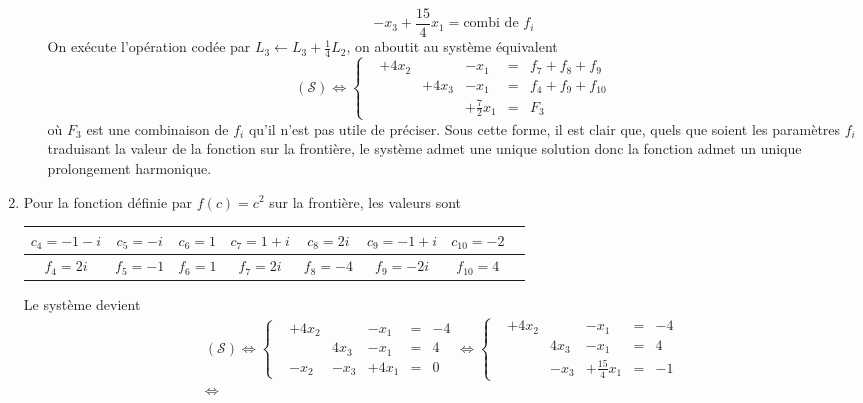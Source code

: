 \begin{enumerate}
\begin{enumerate}
\begin{displaymath}
  -x_3 + \frac{15}{4} x_1 = \text{combi de $f_i$}
\end{displaymath}
On exécute l'opération codée par $L_3 \leftarrow L_3 + \frac{1}{4}L_2$, on aboutit au système équivalent
\begin{displaymath}
  (\mathcal{S}) \Leftrightarrow
\left\lbrace  
\begin{aligned}
  &+4x_2  &      &-x_1  &=& f_7 + f_8 +f_9 \\
  &       &+4x_3 &-x_1 &=& f_4 + f_9 + f_{10} \\
  &       &      &+\frac{7}{2}x_1  &=& F_3
\end{aligned}
\right. 
\end{displaymath}
où $F_3$ est une combinaison de $f_i$ qu'il n'est pas utile de préciser. Sous cette forme, il est clair que, quels que soient les paramètres $f_i$ traduisant la valeur de la fonction sur la frontière, le système admet une unique solution donc la fonction admet un unique prolongement harmonique.
\end{enumerate}
\item Pour la fonction définie par $f(c)=c^2$ sur la frontière, les valeurs sont
\begin{center}
\renewcommand{\arraystretch}{1.5}
\begin{tabular}{|c|c|c|c|c|c|c|c|}
\hline 
 $c_4=-1-i$ & $c_5=-i$ & $c_6=1$ & $c_7=1+i$ & $c_8=2i$ & $c_9=-1+i$ & $c_{10}=-2$\\  \hline
 $f_4=2i$   & $f_5=-1$ & $f_6=1$ & $f_7=2i$  & $f_8=-4$ & $f_9=-2i$  & $f_{10}=4$ \\ \hline
\end{tabular}
\end{center}
Le système devient
\begin{multline*}
  (\mathcal{S}) \Leftrightarrow
\left\lbrace  
\begin{aligned}
  &+4x_2  &      &-x_1  &=& -4 \\
  &       &4x_3 &-x_1 &=& 4 \\
  &-x_2   &-x_3  &+4x_1  &=& 0
\end{aligned}
\right. 
\Leftrightarrow
\left\lbrace  
\begin{aligned}
  &+4x_2  &      &-x_1  &=& -4 \\
  &       &4x_3 &-x_1 &=& 4 \\
  &       &-x_3  &+\frac{15}{4}x_1  &=& -1
\end{aligned}
\right. \\
\Leftrightarrow

\end{multline*}
\end{enumerate}

